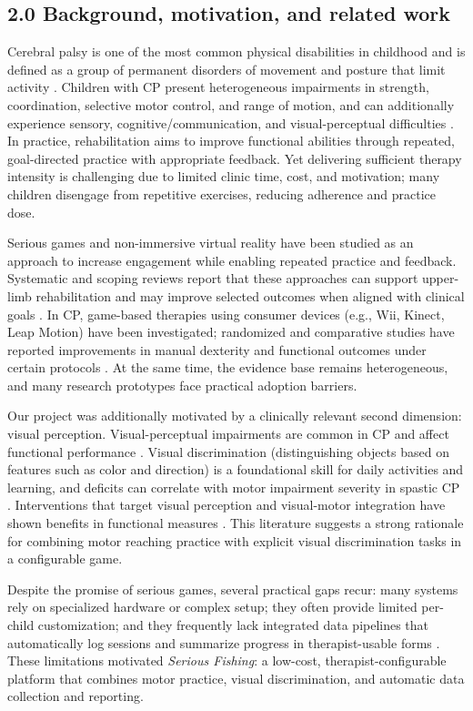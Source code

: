 \documentclass[12pt]{article}
\begin{document}
\subsection*{2.0 Background, motivation, and related work}
Cerebral palsy is one of the most common physical disabilities in childhood and is defined as a group of permanent disorders of movement and posture that limit activity \cite{ref1,ref2}. Children with CP present heterogeneous impairments in strength, coordination, selective motor control, and range of motion, and can additionally experience sensory, cognitive/communication, and visual-perceptual difficulties \cite{ref3}. In practice, rehabilitation aims to improve functional abilities through repeated, goal-directed practice with appropriate feedback. Yet delivering sufficient therapy intensity is challenging due to limited clinic time, cost, and motivation; many children disengage from repetitive exercises, reducing adherence and practice dose.

Serious games and non-immersive virtual reality have been studied as an approach to increase engagement while enabling repeated practice and feedback. Systematic and scoping reviews report that these approaches can support upper-limb rehabilitation and may improve selected outcomes when aligned with clinical goals \cite{ref4,ref5,ref6,ref12,ref13}. In CP, game-based therapies using consumer devices (e.g., Wii, Kinect, Leap Motion) have been investigated; randomized and comparative studies have reported improvements in manual dexterity and functional outcomes under certain protocols \cite{ref11}. At the same time, the evidence base remains heterogeneous, and many research prototypes face practical adoption barriers.

Our project was additionally motivated by a clinically relevant second dimension: visual perception. Visual-perceptual impairments are common in CP and affect functional performance \cite{ref8}. Visual discrimination (distinguishing objects based on features such as color and direction) is a foundational skill for daily activities and learning, and deficits can correlate with motor impairment severity in spastic CP \cite{ref9}. Interventions that target visual perception and visual-motor integration have shown benefits in functional measures \cite{ref10}. This literature suggests a strong rationale for combining motor reaching practice with explicit visual discrimination tasks in a configurable game.

Despite the promise of serious games, several practical gaps recur: many systems rely on specialized hardware or complex setup; they often provide limited per-child customization; and they frequently lack integrated data pipelines that automatically log sessions and summarize progress in therapist-usable forms \cite{ref5,ref6,ref13}. These limitations motivated \textit{Serious Fishing}: a low-cost, therapist-configurable platform that combines motor practice, visual discrimination, and automatic data collection and reporting.
\end{document}
